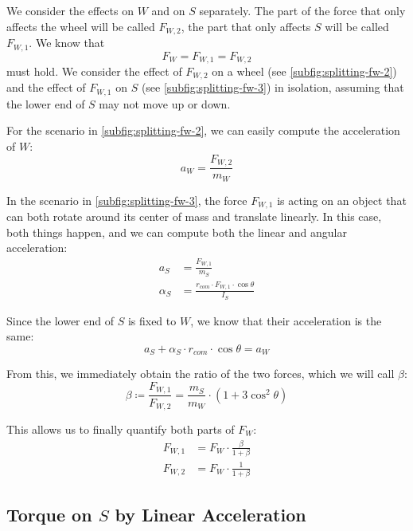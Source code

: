 \documentclass[copyright,submission]{eptcs}
\newcommand{\mi}[1]{\mathit{#1}}
\newcommand{\round}[1]{\left(#1\right)}
\begin{document}
We consider the effects on $W$ and on $S$ separately. The part of the force that only affects the wheel will be called $F_{W,2}$, the part that only affects $S$ will be called $F_{W,1}$. We know that
\begin{equation}
    F_W = F_{W,1} = F_{W,2}
\end{equation}
must hold. We consider the effect of $F_{W,2}$ on a wheel (see \cref{subfig:splitting-fw-2}) and the effect of $F_{W,1}$ on $S$ (see \cref{subfig:splitting-fw-3}) in isolation, assuming that the lower end of $S$ may not move up or down.

For the scenario in \cref{subfig:splitting-fw-2}, we can easily compute the acceleration of $W$:
\begin{equation}
    a_W = \frac{F_{W,2}}{m_W}
\end{equation}

In the scenario in \cref{subfig:splitting-fw-3}, the force $F_{W,1}$ is acting on an object that can both rotate around its center of mass and translate linearly. In this case, both things happen, and we can compute both the linear and angular acceleration:
\begin{align}
    a_S &= \frac{F_{W,1}}{m_S} \\
    \alpha_S &= \frac{r_\mi{com} \cdot F_{W,1} \cdot \cos \theta}{I_S}
\end{align}

Since the lower end of $S$ is fixed to $W$, we know that their acceleration is the same:
\begin{equation}
    a_S + \alpha_S \cdot r_\mi{com} \cdot \cos \theta = a_W
\end{equation}

From this, we immediately obtain the ratio of the two forces, which we will call $\beta$:
\begin{equation}\label{eqn:defining-beta}
    \beta \coloneqq \frac{F_{W,1}}{F_{W,2}} = \frac{m_S}{m_W} \cdot \round{1 + 3 \cos^2 \theta}
\end{equation}

This allows us to finally quantify both parts of $F_W$:
\begin{align}
    F_{W,1} &= F_W \cdot \frac{\beta}{1 + \beta} \label{defining-f-w-1} \\
    F_{W,2} &= F_W \cdot \frac{1}{1 + \beta} \label{defining-f-w-2}
\end{align}


\subsection{Torque on \texorpdfstring{$S$}{S} by Linear Acceleration}
\end{document}
